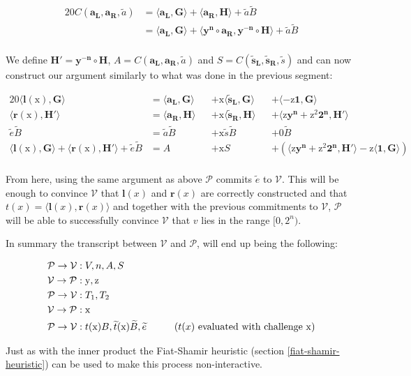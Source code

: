 \documentclass{article}
\newcommand{\eq}[1]{\begin{alignat*}{20}#1\end{alignat*}}
\renewcommand{\vec}[1]{\boldsymbol{#1}}
\newcommand{\ran}[1]{\mathrm{#1}}
\newcommand{\vecran}[1]{\mathbf{#1}}
\newcommand{\V}{\mathcal{V}}
\renewcommand{\P}{\mathcal{P}}
\newcommand{\dotp}[2]{\langle #1, #2 \rangle}
\newcommand{\opn}[1]{\operatorname{#1}}
\newcommand{\vecl}[1]{\vec{#1_{\opn{L}}}}
\newcommand{\vecr}[1]{\vec{#1_{\opn{R}}}}
\newcommand{\blind}[1]{\widetilde{#1}}
\newcommand{\bt}{\blind{t}}
\newcommand{\ba}{\blind{a}}
\newcommand{\bB}{\blind{B}}
\newcommand{\be}{\blind{e}}
\newcommand{\bs}{\blind{s}}
\begin{document}
\eq{
	C(\vecl{a}, \vecr{a}, \ba) &= \dotp{\vecl{a}}{\vec{G}} + \dotp{\vecr{a}}{\vec{H}} + \ba\bB \\
	&= \dotp{\vecl{a}}{\vec{G}} + \dotp{\vecran{y}^{\vec{n}}\circ \vecr{a}}{\vecran{y^{-n}}\circ \vec{H}} + \ba\bB \\
}

We define $\vec{H'} = \vecran{y^{-n}}\circ\vec{H}$, $A =
C(\vecl{a},\vecr{a}, \ba)$ and $S = C(\vecl{\bs}, \vecr{\bs},
\bs)$ and can now construct our argument similarly to what
was done in the previous segment:

\eq{
	\dotp{\vec{l}(\ran{x})}{\vec{G}} &= \dotp{\vecl{a}}{\vec{G}} &&+ \ran{x}\dotp{\vecl{\bs}}{\vec{G}} &&+ \dotp{-\ran{z}\vec{1}}{\vec{G}} \\
	\dotp{\vec{r}(\ran{x})}{\vec{H'}} &= \dotp{\vecr{a}}{\vec{H}} &&+ \ran{x}\dotp{\vecr{\bs}}{\vec{H}} &&+ \dotp{\ran{z}\vecran{y}^{\vec{n}} + \ran{z^2}\vec{2^n}}{\vec{H'}}\\
	\be\bB &= \ba\bB &&+ \ran{x}\bs\bB &&+ 0 \bB \\
	\dotp{\vec{l}(\ran{x})}{\vec{G}} + \dotp{\vec{r}(\ran{x})}{\vec{H'}} + \be\bB &= A &&+ \ran{x}S &&+ (\dotp{\ran{z}\vecran{y}^{\vec{n}} + \ran{z^2}\vec{2^n}}{\vec{H'}} - \ran{z}\dotp{\vec{1}}{\vec{G}}) \\
}

From here, using the same argument as above $\P$ commits $\be$
to $\V$. This will be enough to convince $\V$ that $\vec{l}(x)$
and $\vec{r}(x)$ are correctly constructed and that $t(x) =
\dotp{\vec{l}(x)}{\vec{r}(x)}$ and together with the previous
commitments to $\V$, $\P$ will be able to successfully convince $\V$
that $v$ lies in the range $[0, 2^n)$.

\newpage

In summary the transcript between $\V$ and $\P$, will end up being
the following:

\eq{
	\P \rightarrow \V &: V, n, A, S \\
	\V \rightarrow \P &: \ran{y}, \ran{z} \\
	\P \rightarrow \V &: T_1, T_2 \\
	\V \rightarrow \P &: \ran{x} \\
	\P \rightarrow \V &: t(\ran{x})B, \bt(\ran{x})\bB, \be \hspace*{1cm}\text{($t(x)$ evaluated with challenge $\ran{x}$)}\\
}

Just as with the inner product the Fiat-Shamir heuristic
(section \ref{fiat-shamir-heuristic}) can be used to make this process
non-interactive.
\end{document}
